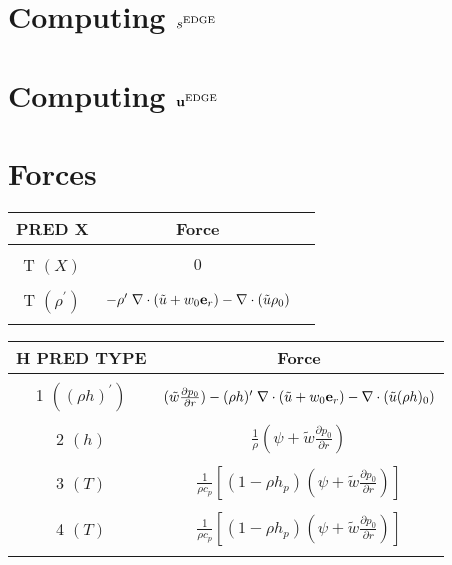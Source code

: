 \documentclass[11pt]{article}
\def\edge  {\rm EDGE}
\def\ub    {{\bf u}}
\def\er    {{\bf e}_r}
\def\ut    {\tilde{u}}
\begin{document}
\section{Computing $s^{\edge}$}


\section{Computing $\ub^{\edge}$}


\section{Forces}

\begin{table*}
\begin{center}
\caption{Forcing term into make edge scal \newline}
\begin{tabular}{|c|c|c|}
\multicolumn{1}{c}{PRED X}   & \multicolumn{1}{c}{Force} \\
\hline
  &   \\
T $(X)$ & $0$ \\
  &   \\
T $(\rho^\prime)$ & $-\rho^\prime \; \nabla \cdot (\ut+w_0 \er) - \nabla \cdot (\ut \rho_0) $  \\
  &   \\
\hline
\end{tabular}
\end{center}
\begin{center}
\begin{tabular}{|c|c|}
\multicolumn{1}{c}{H PRED TYPE}   & \multicolumn{1}{c}{Force} \\
\hline
   & \\
 1 $((\rho h)^\prime)$ &  $(\tilde{w} \frac{\partial p_0}{\partial r}) - (\rho h)^\prime \; \nabla \cdot (\ut+w_0 \er) - \nabla \cdot (\ut (\rho h)_0) $  \\
   & \\
 2 $(h)$ & $\frac{1}{\rho} (\psi + \tilde{w} \frac{\partial p_0}{\partial r})$  \\
   & \\
 3 $(T)$ & $\frac{1}{\rho c_p} \left[ (1 - \rho h_p) (\psi + \tilde{w} \frac{\partial p_0}{\partial r}) \right]$ \\
   & \\
 4 $(T)$ & $\frac{1}{\rho c_p} \left[ (1 - \rho h_p) (\psi + \tilde{w} \frac{\partial p_0}{\partial r}) \right]$ \\
   & \\
\hline
\hline
\end{tabular}
\end{center}
\end{table*}
\end{document}

